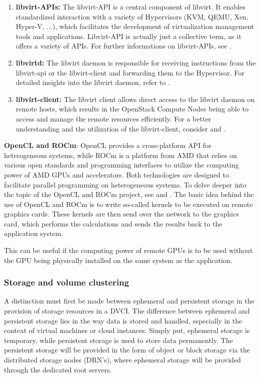 \documentclass[]{article}
\begin{document}
\begin{enumerate}[label=\textbullet]
	\item\textbf{libvirt-APIs:}
	The libvirt-API is a central component of libvirt. 
	It enables standardized interaction with a variety of Hypervisors (KVM, QEMU, Xen, Hyper-V, ...), which facilitates the development of virtualization management tools and applications. 
	Libvirt-API is actually just a collective term, as it offers a variety of APIs. 
	For further informations on libvirt-APIs, see \cite{libvirtDoc-api}.
	
	\item\textbf{libvirtd:}
	The libvirt daemon is responsible for receiving instructions from the libvirt-api or the libvirt-client and forwarding them to the Hypervisor. 
	For detailed insights into the libvirt daemon, refer to \cite{libvirtDoc-daemon}. 
	
	\item\textbf{libvirt-client:}
	The libvirt client allows direct access to the libvirt daemon on remote hosts, which results in the OpenStack Compute Nodes being able to access and manage the remote resources efficiently. 
	For a better understanding and the utilization of the libvirt-client, consider  \cite{libvirtDoc-remote-support} and \cite{libvirtDoc-connection-uri}.
\end{enumerate}

\textbf{OpenCL and ROCm}:
OpenCL provides a cross-platform API for heterogeneous systems, while ROCm is a platform from AMD that relies on various open standards and programming interfaces to utilize the computing power of AMD GPUs and accelerators. 
Both technologies are designed to facilitate parallel programming on heterogeneous systems.
To delve deeper into the topic of the OpenCL and ROCm project, see \cite{OpenCLDoc} and \cite{ROCmDoc}.
The basic idea behind the use of OpenCL and ROCm is to write so-called kernels to be executed on remote graphics cards.
These kernels are then send over the network to the graphics card, which performs the calculations and sends the results back to the application system.

This can be useful if the computing power of remote GPUs is to be used without the GPU being physically installed on the same system as the application. 

\subsubsection{Storage and volume clustering}
A distinction must first be made between ephemeral and persistent storage in the provision of storage resources in a DVCI.
The difference between ephemeral and persistent storage lies in the way data is stored and handled, especially in the context of virtual machines or cloud instances. 
Simply put, ephemeral storage is temporary, while persistent storage is used to store data permanently.
The persistent storage will be provided in the form of object or block storage via the distributed storage nodes (DRN's), where ephemeral storage will be provided through the dedicated root servers. 
\end{document}
